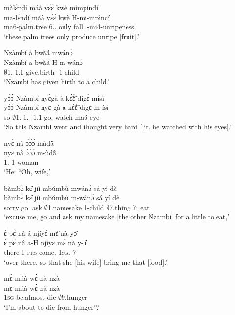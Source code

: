 \begin{exe}[(N234)]
\exN\label{n27} 
  \glll  màlɛ́ndí máà vɛ̀ɛ̀ kwè mímpìndí  \\
         ma-lɛ́ndí máà vɛ̀ɛ̀ kwè H-mi-mpìndí \\
           ma6-palm.tree 6.{\DEM}.{\PROX} only fall {\OBJ}.{\LINK}-mi4-unripeness \\
    \trans `these palm trees only produce unripe [fruit].'
 
\exN\label{n28}
  \glll  Nzàmbí à bwã̀ã́ mwánɔ̀ \\
          Nzàmbí a bwã̀ã-H m-wánɔ̀ \\
             $\emptyset$1.{\PN} 1.{\PST}1 give.birth-{\R} {\N}1-child \\
    \trans `Nzambi has given birth to a child.'
 
\exN\label{n29}
  \glll  yɔ́ɔ̀ Nzàmbí nyɛ̀gà à kɛ̃́ɛ̃̀ dígɛ̀ mísì \\
         yɔ́ɔ̀ Nzàmbí nyɛ-gà a kɛ̃́ɛ̃̀ dígɛ m-ísì \\
           so $\emptyset$1.{\PN} 1.{\SBJ}-{\CONTR} 1.{\PST}1 go.{\COMPL} watch ma6-eye  \\
    \trans `So this Nzambi went and thought very hard [lit. he watched with his eyes].'
 
\exN\label{n30}
  \glll  nyɛ̀ nâ ɔ́ɔ́ɔ́ mùdã̂ \\
          nyɛ nâ ɔ́ɔ́ɔ́ m-ùdã̂ \\
            1.{\SBJ}  {\COMP} {\EXCL} {\N}1-woman  \\
    \trans `He: ``Oh, wife,'
 
\exN\label{n31}
  \glll  bàmbɛ́ kɛ̂ jíì mbúmbù mwánɔ̀ sá yí dè  \\
        bàmbɛ́ kɛ̂ jíì mbúmbù m-wánɔ̀ sá yí dè \\
           sorry  go.{\IMP}  ask $\emptyset$1.namesake {\N}1-child $\emptyset$7.thing 7:{\ATT}  eat  \\
    \trans `excuse me, go and ask my namesake [the other Nzambi] for a little to eat,'
 
\exN\label{n32} 
  \glll   ɛ́ pɛ̀ nâ á njíyɛ̀ mɛ̂ nà yɔ̂ \\
         ɛ́ pɛ̀ nâ a-H njíyɛ mɛ̀ nà y-ɔ̂ \\
         {\LOC} there {\COMP} 1-\textsc{prs} come.{\SBJV}  1\textsc{sg}.{\OBJ} {\COM} 7-{\OBJ}  \\
    \trans `over there, so that she [his wife] bring me that [food].'
 
\exN\label{n33}
  \glll  mɛ̀ múà wɛ̀ nà nzà \\
        mɛ múà wɛ̀ nà nzà \\
          1\textsc{sg} be.almost die {\COM} $\emptyset$9.hunger  \\
    \trans `I'm about to die from hunger''.'
 

\end{exe}
